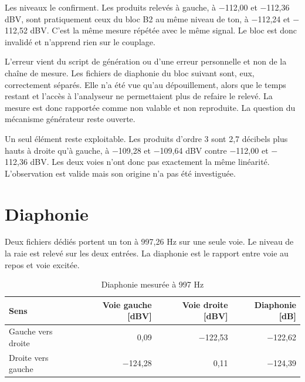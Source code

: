 
Les niveaux le confirment. Les produits relevés à gauche, à $-$112,00 et $-$112,36 dBV, sont pratiquement ceux du bloc B2 au même niveau de ton, à $-$112,24 et $-$112,52 dBV. C'est la même mesure répétée avec le même signal. Le bloc est donc invalidé et n'apprend rien sur le couplage.

L'erreur vient du script de génération ou d'une erreur personnelle et non de la chaîne de mesure. Les fichiers de \gls{diaphonie} du bloc suivant sont, eux, correctement séparés. Elle n'a été vue qu'au dépouillement, alors que le temps restant et l'accès à l'analyseur ne permettaient plus de refaire le relevé. La mesure est donc rapportée comme non valable et non reproduite. La question du mécanisme générateur reste ouverte.

Un seul élément reste exploitable. Les produits d'ordre 3 sont 2,7 décibels plus hauts à droite qu'à gauche, à $-$109,28 et $-$109,64 dBV contre $-$112,00 et $-$112,36 dBV. Les deux voies n'ont donc pas exactement la même linéarité. L'observation est valide mais son origine n'a pas été investiguée.

\section{Diaphonie}
\label{ann:imd:b41}

Deux fichiers dédiés portent un ton à 997,26 Hz sur une seule voie. Le niveau de la raie est relevé sur les deux entrées. La \gls{diaphonie} est le rapport entre voie au repos et voie excitée.



\begin{table}[H]
    \centering
    \caption{Diaphonie mesurée à 997 Hz}
    \label{tab:imd_diaphonie}
    \begin{tabular}{lrrr}
        \toprule
        Sens               & Voie gauche [dBV] & Voie droite [dBV] & Diaphonie [dB] \\
        \midrule
        Gauche vers droite & 0,09              & $-$122,53         & $-$122,62      \\
        Droite vers gauche & $-$124,28         & 0,11              & $-$124,39      \\
        \bottomrule
    \end{tabular}
\end{table}

